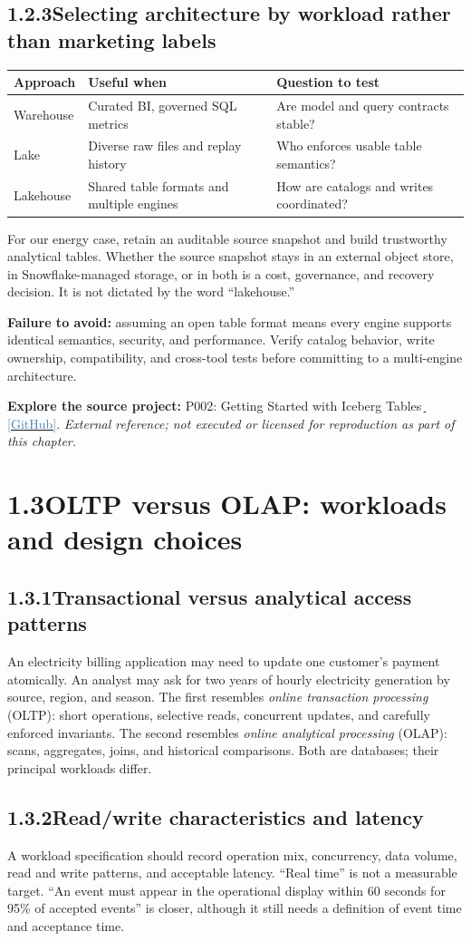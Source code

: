 \documentclass[11pt,twoside]{article}
\newcommand{\topic}[2]{\subsection*{#1\quad #2}}
\newcommand{\repo}[2]{\par\begingroup\small\sffamily\color{inkgray}\textbf{Explore the source project:} #1\,\href{#2}{\,\textcolor{steelblue}{[GitHub]}}. \textit{External reference; not executed or licensed for reproduction as part of this chapter.}\par\endgroup}
\begin{document}
\topic{1.2.3}{Selecting architecture by workload rather than marketing labels}
\begin{center}\small
\begin{tabularx}{\linewidth}{@{}p{26mm}X X@{}}\toprule
\textbf{Approach} & \textbf{Useful when} & \textbf{Question to test}\\\midrule
Warehouse & Curated BI, governed SQL metrics & Are model and query contracts stable?\\
Lake & Diverse raw files and replay history & Who enforces usable table semantics?\\
Lakehouse & Shared table formats and multiple engines & How are catalogs and writes coordinated?\\
\bottomrule\end{tabularx}
\end{center}
For our energy case, retain an auditable source snapshot and build trustworthy analytical tables. Whether the source snapshot stays in an external object store, in Snowflake-managed storage, or in both is a cost, governance, and recovery decision. It is not dictated by the word ``lakehouse.''

\textbf{Failure to avoid:} assuming an open table format means every engine supports identical semantics, security, and performance. Verify catalog behavior, write ownership, compatibility, and cross-tool tests before committing to a multi-engine architecture.
\repo{P002: Getting Started with Iceberg Tables}{https://github.com/Snowflake-Labs/sfguide-getting-started-with-iceberg-tables}

\section*{1.3\quad OLTP versus OLAP: workloads and design choices}
\topic{1.3.1}{Transactional versus analytical access patterns}
An electricity billing application may need to update one customer's payment atomically. An analyst may ask for two years of hourly electricity generation by source, region, and season. The first resembles \emph{online transaction processing} (OLTP): short operations, selective reads, concurrent updates, and carefully enforced invariants. The second resembles \emph{online analytical processing} (OLAP): scans, aggregates, joins, and historical comparisons. Both are databases; their principal workloads differ.

\topic{1.3.2}{Read/write characteristics and latency}
A workload specification should record operation mix, concurrency, data volume, read and write patterns, and acceptable latency. ``Real time'' is not a measurable target. ``An event must appear in the operational display within 60 seconds for 95\% of accepted events'' is closer, although it still needs a definition of event time and acceptance time.
\end{document}
